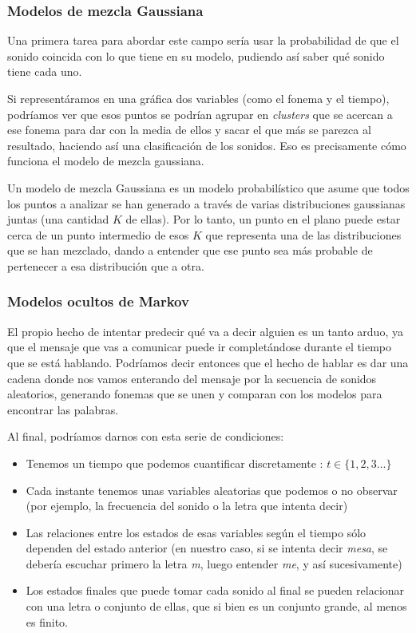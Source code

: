\subsubsection{Modelos de mezcla Gaussiana} 
Una primera tarea para abordar este campo sería usar la probabilidad de que el sonido coincida con lo que tiene en su modelo, pudiendo así saber qué sonido tiene cada uno.

Si representáramos en una gráfica dos variables (como el fonema y el tiempo), podríamos ver que esos puntos se podrían agrupar en \textit{clusters} que se acercan a ese fonema para dar con la media de ellos y sacar el que más se parezca al resultado, haciendo así una clasificación de los sonidos. Eso es precisamente cómo funciona el modelo de mezcla gaussiana.

Un modelo de mezcla Gaussiana \cite{gaussiana} es un modelo probabilístico que asume que todos los puntos a analizar se han generado a través de varias distribuciones gaussianas juntas (una cantidad $K$ de ellas). Por lo tanto, un punto en el plano puede estar cerca de un punto intermedio de esos $K$ que representa una de las distribuciones que se han mezclado, dando a entender que ese punto sea más probable de pertenecer a esa distribución que a otra.

\subsubsection{Modelos ocultos de Markov} 

El propio hecho de intentar predecir qué va a decir alguien es un tanto arduo, ya que el mensaje que vas a comunicar puede ir completándose durante el tiempo que se está hablando. Podríamos decir entonces que el hecho de hablar es dar una cadena donde nos vamos enterando del mensaje por la secuencia de sonidos aleatorios, generando fonemas que se unen y comparan con los modelos para encontrar las palabras.

Al final, podríamos darnos con esta serie de condiciones:
\begin{itemize}
	\item Tenemos un tiempo que podemos cuantificar discretamente : $ t \in \{1,2,3...\} $
	\item Cada instante tenemos unas variables aleatorias que podemos o no observar (por ejemplo, la frecuencia del sonido o la letra que intenta decir)
	\item Las relaciones entre los estados de esas variables según el tiempo sólo dependen del estado anterior (en nuestro caso, si se intenta decir \textit{mesa}, se debería escuchar primero la letra \textit{m}, luego entender \textit{me}, y así sucesivamente)
	\item Los estados finales que puede tomar cada sonido al final se pueden relacionar con una letra o conjunto de ellas, que si bien es un conjunto grande, al menos es finito.
\end{itemize}

